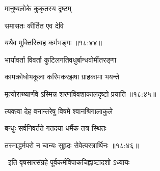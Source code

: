 {\devanagarifontbold मानुष्यलोके कुकृतस्य दृष्टम्  \danda\dontdisplaylinenum }%
 
\nemslokae

{\devanagarifontbold समासतः कीर्तित एव देवि }%
  \dontdisplaylinenum    {}%


\nemslokad

{\devanagarifontbold यथैव मुक्तिस्त्विह कर्मभङ्गः {॥१८:४४॥} \veg\dontdisplaylinenum }%

\ujvers{}

\nemslokab

{\devanagarifontbold भार्यावर्ता विवर्ता कुटिलगतिवधुर्बान्धवोर्मीतरङ्गा  \danda\dontdisplaylinenum }%
 
\nemslokac

{\devanagarifontbold कामक्रोधोभकूला करिमकरझषा ग्राहकामा भयन्ते }%
  \dontdisplaylinenum

\nemslokad

{\devanagarifontbold मृत्योराख्यार्णवे ऽस्मिन्न शरणविवशाकालदृष्टो प्रयाति {॥१८:४५॥} \veg\dontdisplaylinenum }%
 
\ujvers{}

\nemslokab

{\devanagarifontbold त्यक्त्वा देह वनान्तरेषु विषमे श्वानश्रिगालाकुले  \danda\dontdisplaylinenum }%
 
\nemslokac

{\devanagarifontbold बन्धुः सर्वनिवर्तते गतदया धर्मैक तत्र स्थितः }%
  \dontdisplaylinenum

\nemslokad

{\devanagarifontbold तस्माद्धर्मपरो न चान्यः सुहृदः सेवेत्परत्रार्थिनः {॥१८:४६॥} \veg\dontdisplaylinenum }%
 
\vers


{\devanagarifontbold 
\jump
\begin{center}
\ketdanda\ इति वृषसारसंग्रहे पूर्वकर्मविपाकचिह्नाष्टादशो ऽध्यायः\ketdanda
\end{center}
\dontdisplaylinenum\vers  }%

